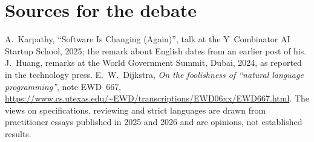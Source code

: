 \section*{Sources for the debate}
{\small
A.~Karpathy, ``Software Is Changing (Again)'', talk at the Y~Combinator AI Startup School,
2025; the remark about English dates from an earlier post of his.
J.~Huang, remarks at the World Government Summit, Dubai, 2024, as reported in the
technology press.
E.~W.~Dijkstra, \emph{On the foolishness of ``natural language programming''}, note
EWD~667, \url{https://www.cs.utexas.edu/~EWD/transcriptions/EWD06xx/EWD667.html}.
The views on specifications, reviewing and strict languages are drawn from practitioner
essays published in 2025 and 2026 and are opinions, not established results.\par}
